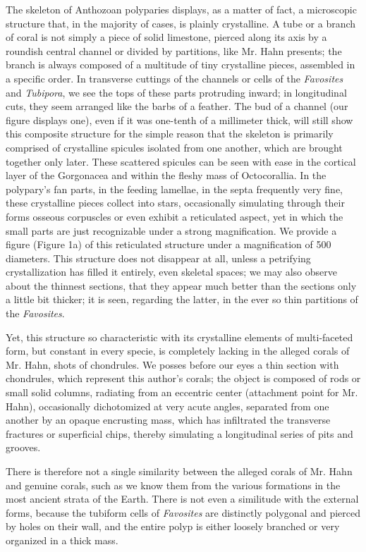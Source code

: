 \documentclass[a4paper, 12pt, oneside]{article}
\begin{document}
The skeleton of Anthozoan polyparies displays, as a matter of fact, a microscopic structure that, in the majority of cases, is plainly crystalline. A tube or a branch of coral is not simply a piece of solid limestone, pierced along its axis by a roundish central channel or divided by partitions, like Mr. Hahn presents; the branch is always composed of a multitude of tiny crystalline pieces, assembled in a specific order. In transverse cuttings of the channels or cells of the \emph{Favosites} and \emph{Tubipora}, we see the tops of these parts protruding inward; in longitudinal cuts, they seem arranged like the barbs of a feather. The bud of a channel (our figure displays one), even if it was one-tenth of a millimeter thick, will still show this composite structure for the simple reason that the skeleton is primarily comprised of crystalline spicules isolated from one another, which are brought together only later. These scattered spicules can be seen with ease in the cortical layer of the Gorgonacea and within the fleshy mass of Octocorallia. In the polypary's fan parts, in the feeding lamellae, in the septa frequently very fine, these crystalline pieces collect into stars, occasionally simulating through their forms osseous corpuscles or even exhibit a reticulated aspect, yet in which the small parts are just recognizable under a strong magnification. We provide a figure (Figure 1a) of this reticulated structure under a magnification of 500 diameters. This structure does not disappear at all, unless a petrifying crystallization has filled it entirely, even skeletal spaces; we may also observe about the thinnest sections, that they appear much better than the sections only a little bit thicker; it is seen, regarding the latter, in the ever so thin partitions of the \emph{Favosites}.

Yet, this structure so characteristic with its crystalline elements of multi-faceted form, but constant in every specie, is completely lacking in the alleged corals of Mr. Hahn, shots of chondrules. We posses before our eyes a thin section with chondrules, which represent this author's corals; the object is composed of rods or small solid columns, radiating from an eccentric center (attachment point for Mr. Hahn), occasionally dichotomized at very acute angles, separated from one another by an opaque encrusting mass, which has infiltrated the transverse fractures or superficial chips, thereby simulating a longitudinal series of pits and grooves.

There is therefore not a single similarity between the alleged corals of Mr. Hahn and genuine corals, such as we know them from the various formations in the most ancient strata of the Earth. There is not even a similitude with the external forms, because the tubiform cells of \emph{Favosites} are distinctly polygonal and pierced by holes on their wall, and the entire polyp is either loosely branched or very organized in a thick mass.
\end{document}
